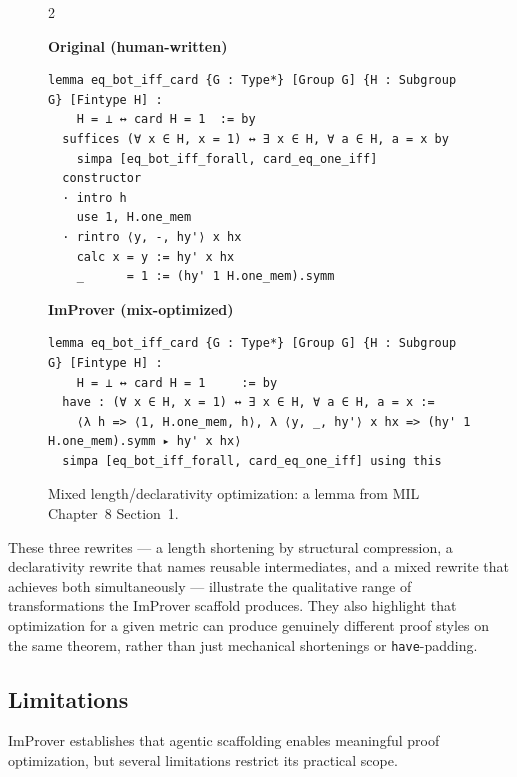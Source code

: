\setlength{\columnsep}{0.2cm}
\begin{figure}[ht]
\begin{multicols}{2}
{
\textbf{Original (human-written)}
\begin{scriptsize}
\begin{lstlisting}[basicstyle=\scriptsize\ttfamily]
lemma eq_bot_iff_card {G : Type*} [Group G] {H : Subgroup G} [Fintype H] :
    H = ⊥ ↔ card H = 1  := by
  suffices (∀ x ∈ H, x = 1) ↔ ∃ x ∈ H, ∀ a ∈ H, a = x by
    simpa [eq_bot_iff_forall, card_eq_one_iff]
  constructor
  · intro h
    use 1, H.one_mem
  · rintro ⟨y, -, hy'⟩ x hx
    calc x = y := hy' x hx
    _      = 1 := (hy' 1 H.one_mem).symm
\end{lstlisting}
\end{scriptsize}
}
\vfill\null
\columnbreak
{
\textbf{ImProver (mix-optimized)}
\begin{scriptsize}
\begin{lstlisting}[basicstyle=\scriptsize\ttfamily]
lemma eq_bot_iff_card {G : Type*} [Group G] {H : Subgroup G} [Fintype H] :
    H = ⊥ ↔ card H = 1     := by
  have : (∀ x ∈ H, x = 1) ↔ ∃ x ∈ H, ∀ a ∈ H, a = x :=
    ⟨λ h => ⟨1, H.one_mem, h⟩, λ ⟨y, _, hy'⟩ x hx => (hy' 1 H.one_mem).symm ▸ hy' x hx⟩
  simpa [eq_bot_iff_forall, card_eq_one_iff] using this
\end{lstlisting}
\end{scriptsize}
}
\end{multicols}
\vspace{-2.5em}
\caption{Mixed length/declarativity optimization: a lemma from MIL Chapter~8 Section~1.}
\label{fig:qual-mix-ch5}
\end{figure}

These three rewrites --- a length shortening by structural compression, a declarativity rewrite that names reusable intermediates, and a mixed rewrite that achieves both simultaneously --- illustrate the qualitative range of transformations the ImProver scaffold produces. They also highlight that optimization for a given metric can produce genuinely different proof styles on the same theorem, rather than just mechanical shortenings or \texttt{have}-padding.



\subsection{Limitations}
\label{sec:imp1_limitations}

ImProver establishes that agentic scaffolding enables meaningful proof optimization, but several limitations restrict its practical scope.

